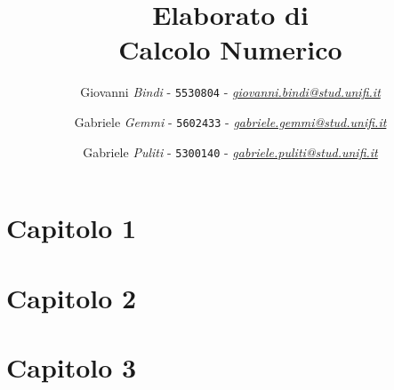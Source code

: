 \documentclass[a4paper]{article}
\begin{document}
\title{Elaborato di \\ \textbf{Calcolo Numerico}}

\author{Giovanni \emph{Bindi} - \texttt{5530804} - \href{mailto:giovanni.bindi@stud.unifi.it}{\textit{giovanni.bindi@stud.unifi.it}}
   \and Gabriele \emph{Gemmi} - \texttt{5602433} -
   \href{mailto:gabriele.gemmi@stud.unifi.it}{\textit{gabriele.gemmi@stud.unifi.it}}
   \and Gabriele \emph{Puliti} - \texttt{5300140} - \href{mailto:gabriele.puliti@stud.unifi.it}{\textit{gabriele.puliti@stud.unifi.it}}}

\maketitle

\tableofcontents


\newpage
\section{\textbf{Capitolo 1}}


\newpage
\section{\textbf{Capitolo 2}}


\newpage
\section{\textbf{Capitolo 3}}

\end{document}
